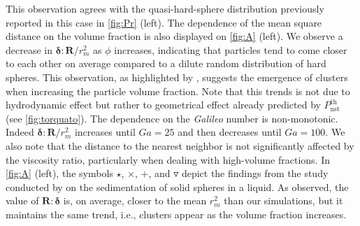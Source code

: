 This observation agrees with the quasi-hard-sphere distribution previously reported in this case in \ref{fig:Pr} (left).
The dependence of the mean square distance on the volume fraction is also displayed on \ref{fig:A} (left). 
We observe a decrease in $\bm\delta:\textbf{R}/r_m^2$ as $\phi$ increases, indicating that particles tend to come closer to each other on average compared to a dilute random distribution of hard spheres. 
This observation, as highlighted by \citet{zhang2023evolution}, suggests the emergence of clusters when increasing the particle volume fraction. 
Note that this trends is not due to hydrodynamic effect but rather to geometrical effect already predicted by $P_\text{nst}^\text{th}$ (see \ref{fig:torquato}). 
The dependence on the \textit{Galileo} number is non-monotonic. 
Indeed $\bm\delta:\textbf{R}/r_m^2$ increases until $Ga = 25$ and then decreases until $Ga = 100$. We also note that the distance to the nearest neighbor is not significantly affected by the viscosity ratio, particularly when dealing with high-volume fractions. 
In \ref{fig:A} (left), the symbols $\pmb\star$, $\pmb\times$, $\pmb +$, and $\pmb\triangledown$ depict the findings from the study conducted by \citet{zhang2023evolution} on the sedimentation of solid spheres in a liquid.
As observed, the value of $\textbf{R}:\bm\delta$ is, on average, closer to the mean $r_m^2$ than our simulations, but it maintains the same trend, i.e., clusters appear as the volume fraction increases.
 
